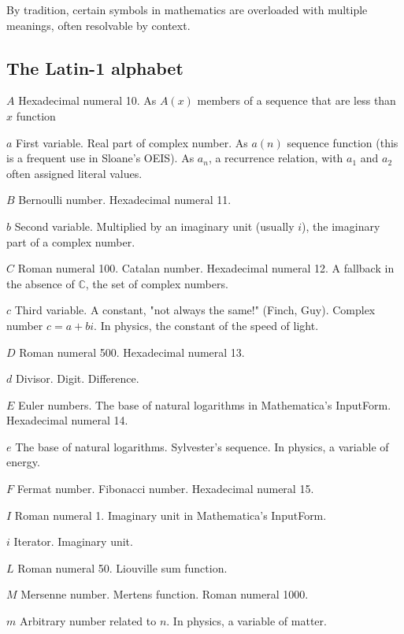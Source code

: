 \documentclass[12pt]{article}
\begin{document}
By tradition, certain symbols in mathematics are overloaded with multiple meanings, often resolvable by context.

\subsection{The Latin-1 alphabet}

$A$ Hexadecimal numeral 10. As $A(x)$ members of a sequence that are less than $x$ function

$a$ First variable. Real part of complex number. As $a(n)$ sequence function (this is a frequent use in Sloane's OEIS). As $a_n$, a recurrence relation, with $a_1$ and $a_2$ often assigned literal values.

$B$ Bernoulli number. Hexadecimal numeral 11.

$b$ Second variable. Multiplied by an imaginary unit (usually $i$), the imaginary part of a complex number.

$C$ Roman numeral 100. Catalan number. Hexadecimal numeral 12. A fallback in the absence of $\mathbb{C}$, the set of complex numbers.

$c$ Third variable. A constant, "not always the same!" (Finch, Guy). Complex number $c = a + bi$. In physics, the constant of the speed of light.

$D$ Roman numeral 500. Hexadecimal numeral 13.

$d$ Divisor. Digit. Difference.

$E$ Euler numbers. The base of natural logarithms in Mathematica's InputForm. Hexadecimal numeral 14.

$e$ The base of natural logarithms. Sylvester's sequence. In physics, a variable of energy.

$F$ Fermat number. Fibonacci number. Hexadecimal numeral 15.




$I$ Roman numeral 1. Imaginary unit in Mathematica's InputForm.

$i$ Iterator. Imaginary unit.



$L$ Roman numeral 50. Liouville sum function.

$M$ Mersenne number. Mertens function. Roman numeral 1000.

$m$ Arbitrary number related to $n$. In physics, a variable of matter.
\end{document}
